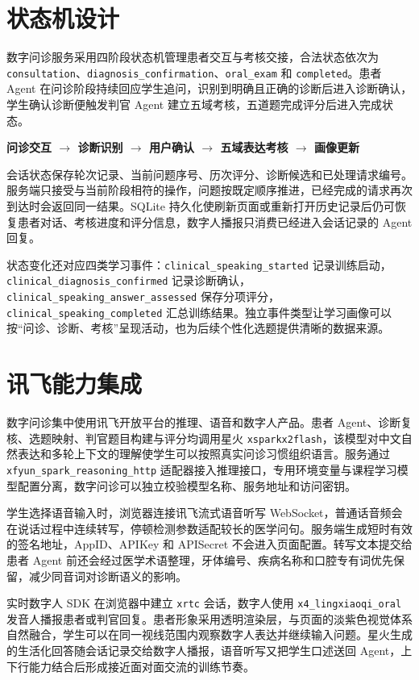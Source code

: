 \section{状态机设计}

数字问诊服务采用四阶段状态机管理患者交互与考核交接，合法状态依次为 \texttt{consultation}、\texttt{diagnosis\_confirmation}、\texttt{oral\_exam} 和 \texttt{completed}。患者 Agent 在问诊阶段持续回应学生追问，识别到明确且正确的诊断后进入诊断确认，学生确认诊断便触发判官 Agent 建立五域考核，五道题完成评分后进入完成状态。

\begin{center}
  \textbf{问诊交互 $\rightarrow$ 诊断识别 $\rightarrow$ 用户确认 $\rightarrow$ 五域表达考核 $\rightarrow$ 画像更新}
\end{center}

会话状态保存轮次记录、当前问题序号、历次评分、诊断候选和已处理请求编号。服务端只接受与当前阶段相符的操作，问题按既定顺序推进，已经完成的请求再次到达时会返回同一结果。SQLite 持久化使刷新页面或重新打开历史记录后仍可恢复患者对话、考核进度和评分信息，数字人播报只消费已经进入会话记录的 Agent 回复。

状态变化还对应四类学习事件：\texttt{clinical\_speaking\_started} 记录训练启动，\texttt{clinical\_diagnosis\_confirmed} 记录诊断确认，\texttt{clinical\_speaking\_answer\_assessed} 保存分项评分，\texttt{clinical\_speaking\_completed} 汇总训练结果。独立事件类型让学习画像可以按“问诊、诊断、考核”呈现活动，也为后续个性化选题提供清晰的数据来源。

\section{讯飞能力集成}

数字问诊集中使用讯飞开放平台的推理、语音和数字人产品。患者 Agent、诊断复核、选题映射、判官题目构建与评分均调用星火 \texttt{xsparkx2flash}，该模型对中文自然表达和多轮上下文的理解使学生可以按照真实问诊习惯组织语言。服务通过 \texttt{xfyun\_spark\_reasoning\_http} 适配器接入推理接口，专用环境变量与课程学习模型配置分离，数字问诊可以独立校验模型名称、服务地址和访问密钥。

学生选择语音输入时，浏览器连接讯飞流式语音听写 WebSocket，普通话音频会在说话过程中连续转写，停顿检测参数适配较长的医学问句。服务端生成短时有效的签名地址，AppID、APIKey 和 APISecret 不会进入页面配置。转写文本提交给患者 Agent 前还会经过医学术语整理，牙体编号、疾病名称和口腔专有词优先保留，减少同音词对诊断语义的影响。

实时数字人 SDK 在浏览器中建立 \texttt{xrtc} 会话，数字人使用 \texttt{x4\_lingxiaoqi\_oral} 发音人播报患者或判官回复。患者形象采用透明渲染层，与页面的淡紫色视觉体系自然融合，学生可以在同一视线范围内观察数字人表达并继续输入问题。星火生成的生活化回答随会话记录交给数字人播报，语音听写又把学生口述送回 Agent，上下行能力结合后形成接近面对面交流的训练节奏。

